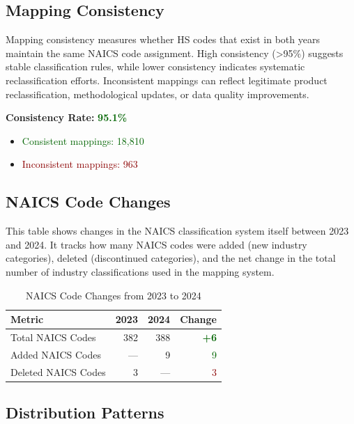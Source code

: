 \documentclass[11pt]{article}
\newcommand{\increase}[1]{\textcolor{darkgreen}{\textbf{+#1}}}
\begin{document}
\subsection{Mapping Consistency}

Mapping consistency measures whether HS codes that exist in both years maintain the same NAICS code assignment. High consistency (>95\%) suggests stable classification rules, while lower consistency indicates systematic reclassification efforts. Inconsistent mappings can reflect legitimate product reclassification, methodological updates, or data quality improvements.


\textbf{Consistency Rate:} \textcolor{darkgreen}{\textbf{95.1\%}}

\begin{itemize}
    \item \textcolor{darkgreen}{Consistent mappings: 18,810}
    \item \textcolor{darkred}{Inconsistent mappings: 963}
\end{itemize}

\subsection{NAICS Code Changes}

This table shows changes in the NAICS classification system itself between 2023 and 2024. It tracks how many NAICS codes were added (new industry categories), deleted (discontinued categories), and the net change in the total number of industry classifications used in the mapping system.

\begin{table}[H]
\centering
{}
\begin{tabular}{lrrr}
\toprule
\textbf{Metric} & \textbf{2023} & \textbf{2024} & \textbf{Change} \\
\midrule
Total NAICS Codes & 382 & 388 & \increase{6} \\
Added NAICS Codes & --- & 9 & \textcolor{darkgreen}{9} \\
Deleted NAICS Codes & 3 & --- & \textcolor{darkred}{3} \\
\bottomrule
\end{tabular}
\caption{NAICS Code Changes from 2023 to 2024}
\end{table}

\subsection{Distribution Patterns}
\end{document}
